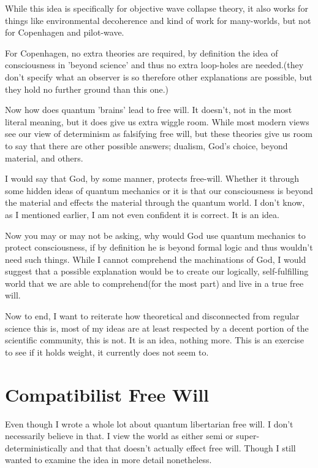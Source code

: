 \par While this idea is specifically for objective wave collapse theory, it also works for things like environmental decoherence and kind of work for many-worlds, but not for Copenhagen and pilot-wave.
\par For Copenhagen, no extra theories are required, by definition the idea of consciousness in 'beyond science' and thus no extra loop-holes are needed.(they don't specify what an observer is so therefore other explanations are possible, but they hold no further ground than this one.)
\par Now how does quantum 'brains' lead to free will. It doesn't, not in the most literal meaning, but it does give us extra wiggle room. While most modern views see our view of determinism as falsifying free will, but these theories give us room to say that there are other possible answers; dualism, God's choice, beyond material, and others.
\par I would say that God, by some manner, protects free-will. Whether it through some hidden ideas of quantum mechanics or it is that our consciousness is beyond the material and effects the material through the quantum world. I don't know, as I mentioned earlier, I am not even confident it is correct. It is an idea.
\par Now you may or may not be asking, why would God use quantum mechanics to protect consciousness, if by definition he is beyond formal logic and thus wouldn't need such things. While I cannot comprehend the machinations of God, I would suggest that a possible explanation would be to create our logically, self-fulfilling world that we are able to comprehend(for the most part) and live in a true free will.
\par Now to end, I want to reiterate how theoretical and disconnected from regular science this is, most of my ideas are at least respected by a decent portion of the scientific community, this is not. It is an idea, nothing more. This is an exercise to see if it holds weight, it currently does not seem to.
\section{Compatibilist Free Will}
\par Even though I wrote a whole lot about quantum libertarian free will. I don't necessarily believe in that. I view the world as either semi or super-deterministically and that that doesn't actually effect free will. Though I still wanted to examine the idea in more detail nonetheless.

